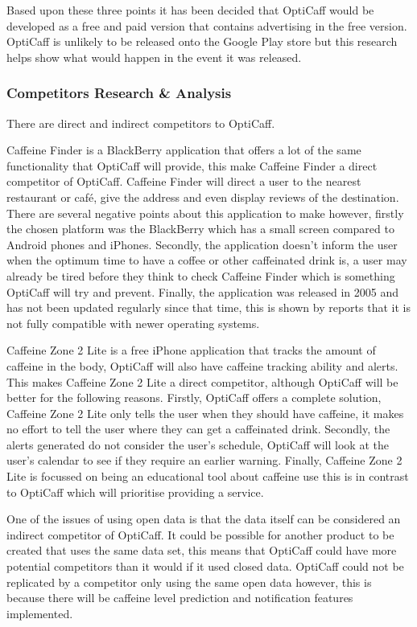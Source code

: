 Based upon these three points it has been decided that OptiCaff would be developed as a free and paid version that contains advertising in the free version. OptiCaff is unlikely to be released onto the Google Play store but this research helps show what would happen in the event it was released.

\subsubsection{Competitors Research \& Analysis}
\label{sec:competitors}
There are direct and indirect competitors to OptiCaff.

Caffeine Finder is a BlackBerry application that offers a lot of the same functionality that OptiCaff will provide, this make Caffeine Finder a direct competitor of OptiCaff. Caffeine Finder will direct a user to the nearest restaurant or café, give the address and even display reviews of the destination. There are several negative points about this application to make however, firstly the chosen platform was the BlackBerry which has a small screen compared to Android phones and iPhones. Secondly, the application doesn’t inform the user when the optimum time to have a coffee or other caffeinated drink is, a user may already be tired before they think to check Caffeine Finder which is something OptiCaff will try and prevent. Finally, the application was released in 2005 and has not been updated regularly since that time, this is shown by reports that it is not fully compatible with newer operating systems.

Caffeine Zone 2 Lite is a free iPhone application that tracks the amount of caffeine in the body, OptiCaff will also have caffeine tracking ability and alerts. This makes Caffeine Zone 2 Lite a direct competitor, although OptiCaff will be better for the following reasons. Firstly, OptiCaff offers a complete solution, Caffeine Zone 2 Lite only tells the user when they should have caffeine, it makes no effort to tell the user where they can get a caffeinated drink. Secondly, the alerts generated do not consider the user’s schedule, OptiCaff will look at the user’s calendar to see if they require an earlier warning. Finally, Caffeine Zone 2 Lite is focussed on being an educational tool about caffeine use this is in contrast to OptiCaff which will prioritise providing a service.

One of the issues of using open data is that the data itself can be considered an indirect competitor of OptiCaff. It could be possible for another product to be created that uses the same data set, this means that OptiCaff could have more potential competitors than it would if it used closed data. OptiCaff could not be replicated by a competitor only using the same open data however, this is because there will be caffeine level prediction and notification features implemented.

